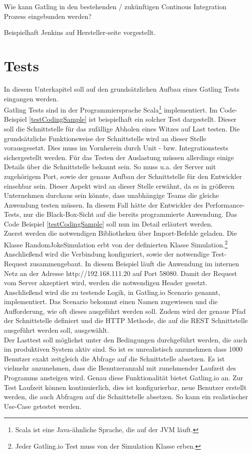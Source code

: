 Wie kann Gatling in den bestehenden / zukünftigen Continous Integration Prozess eingebunden werden?

Beispielhaft Jenkins auf Hersteller-seite vorgestellt.


\section{Tests}
In diesem Unterkapitel soll auf den grundsätzlichen Aufbau eines Gatling Tests eingangen werden.\\
Gatling Tests sind in der Programmiersprache Scala\footnote{{} Scala ist eine Java-ähnliche Sprache, die auf der \ac{JVM} läuft.} implementiert.
Im Code-Beispiel \ref{testCodingSample} ist beispielhaft ein solcher Test dargestellt. Dieser soll die Schnittstelle für das zufällige Abholen eines Witzes auf Last testen. Die grundsätzliche Funktionsweise der Schnittstelle wird an dieser Stelle vorausgesetzt. Dies muss im Vornherein durch Unit - bzw. Integrationstests sichergestellt werden. Für das Testen der Auslastung müssen allerdings einige Details über die Schnittstelle bekannt sein. So muss u.a. der Server mit zugehörigem Port, sowie der genaue Aufbau der Schnittstelle für den Entwickler einsehbar sein. Dieser Aspekt wird an dieser Stelle erwähnt, da es in größeren Unternehmen durchaus sein könnte, dass unabhängige Teams die gleiche Anwendung testen müssen. In diesem Fall hätte der Entwickler des Performance-Tests, nur die Black-Box-Sicht auf die bereits programmierte Anwendung. Das Code Beispiel \ref{testCodingSample} soll nun im Detail erläutert werden.\\
Zuerst werden die notwendigen Bibliotheken über \glqq Import-Befehle\grqq{} geladen. Die Klasse \glqq RandomJokeSimulation\grqq{} erbt von der definierten Klasse \glqq Simulation\grqq{}.\footnote{{} Jeder Gatling.io Test muss von der Simulation Klasse erben.} Anschließend wird die Verbindung konfiguriert, sowie der notwendige Test-Request zusammengebaut. In diesem Beispiel läuft die Anwendung im internen Netz an der Adresse \glqq http://192.168.111.20\grqq{} auf Port 58080. Damit der Request vom Server akzeptiert wird, werden die notwendigen Header gesetzt. \\
Anschließend wird die zu testende Logik, in Gatling.io \glqq Scenario\grqq{} genannt, implementiert. Das Scenario bekommt einen Namen zugewiesen und die Aufforderung, wie oft dieses ausgeführt werden soll. Zudem wird der genaue Pfad der Schnittstelle definiert und die \ac{HTTP} Methode, die auf die \ac{REST} Schnittstelle ausgeführt werden soll, ausgewählt.\\
Der Lasttest soll möglichst unter den Bedingungen durchgeführt werden, die auch im produktiven System aktiv sind. So ist es unrealistisch anzunehmen dass 1000 Benutzer exakt zeitgleich die Abfrage auf die Schnittstelle absetzen. Es ist vielmehr anzunehmen, dass die Benutzeranzahl mit zunehmender Laufzeit des Programms ansteigen wird. Genau diese Funktionalität bietet Gatling.io an. Zur Test Laufzeit können kontinuierlich, dies ist konfigurierbar, neue Benutzer erstellt werden, die auch Abfragen auf die Schnittstelle absetzen. So kann ein realistischer Use-Case getestet werden.\\ 

